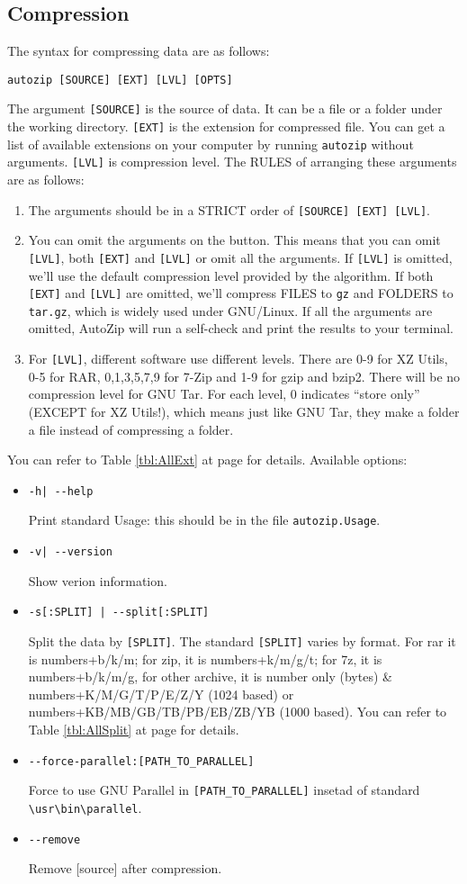\documentclass[fleqn,10pt]{SelfArx} %
\begin{document}
\subsection{Compression}
The syntax for compressing data are as follows:
\begin{verbatim}
autozip [SOURCE] [EXT] [LVL] [OPTS]
\end{verbatim}
The argument \verb|[SOURCE]| is the source of data. It can be a file or a folder under the working directory. \verb|[EXT]| is the extension for compressed file. You can get a list of available extensions on your computer by running \verb|autozip| without arguments. \verb|[LVL]| is compression level. The RULES of arranging these arguments are as follows:
\begin{enumerate}
\item The arguments should be in a STRICT order of \verb|[SOURCE] [EXT] [LVL]|.
\item You can omit the arguments on the button. This means that you can omit \verb|[LVL]|, both \verb|[EXT]| and \verb|[LVL]| or omit all the arguments. If \verb|[LVL]| is omitted, we'll use the default compression level provided by the algorithm. If both \verb|[EXT]| and \verb|[LVL]| are omitted, we'll compress FILES to \verb|gz| and FOLDERS to \verb|tar.gz|, which is widely used under GNU/Linux. If all the arguments are omitted, AutoZip will run a self-check and print the results to your terminal.
\item For \verb|[LVL]|, different software use different levels. There are 0-9 for XZ Utils, 0-5 for RAR, 0,1,3,5,7,9 for 7-Zip and 1-9 for gzip and bzip2. There will be no compression level for GNU Tar. For each level, 0 indicates ``store only'' (EXCEPT for XZ Utils!), which means just like GNU Tar, they make a folder a file instead of compressing a folder.
\end{enumerate}
You can refer to Table \ref{tbl:AllExt} at page \pageref{tbl:AllExt} for details. Available options:
\begin{itemize}
\item \verb+-h| --help+ \par Print standard Usage: this should be in the file \verb|autozip.Usage|.
\item \verb+-v| --version+ \par Show verion information.
\item \verb+-s[:SPLIT] | --split[:SPLIT]+ \par Split the data by \verb|[SPLIT]|. The standard \verb|[SPLIT]| varies by format. For rar it is numbers+b/k/m; for zip, it is numbers+k/m/g/t; for 7z, it is numbers+b/k/m/g, for other archive, it is number only (bytes) \& numbers+K/M/G/T/P/E/Z/Y (1024 based) or numbers+KB/MB/GB/TB/PB/EB/ZB/YB (1000 based). You can refer to Table \ref{tbl:AllSplit} at page \pageref{tbl:AllSplit} for details.
\item \verb+--force-parallel:[PATH_TO_PARALLEL]+ \par Force to use GNU Parallel in \verb|[PATH_TO_PARALLEL]| insetad of standard \verb|\usr\bin\parallel|.
\item \verb+--remove+ \par Remove [source] after compression.
\end{itemize}
\end{document}
